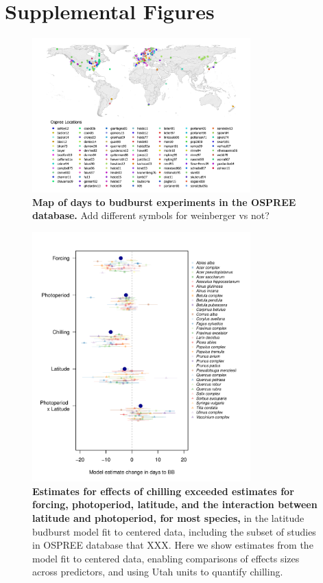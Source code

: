 \documentclass{article}
\begin{document}
% 
\newpage

\newpage
\section* {Supplemental Figures}

\newpage
\begin{figure}[h!]
\centering
\noindent \includegraphics[width=0.75\textwidth]{..//..//analyses/bb_analysis/figures/ospree_locations2.png}
\caption{\textbf{Map of days to budburst experiments in the OSPREE database.} Add different symbols for weinberger vs not?}
\label{fig:map}
\end{figure}




\newpage
\begin{figure}[h!]
\centering
\noindent \includegraphics[width=0.75\textwidth]{..//..//analyses/lat_analysis/figures/latanalysis_spcom_expramp_fp.pdf}
\caption{\textbf{Estimates for effects of chilling exceeded estimates for forcing, photoperiod, latitude, and the interaction between latitude and photoperiod, for most species,} in the latitude budburst model fit to centered data, including the subset of studies in OSPREE database that XXX. Here we show estimates from the model fit to centered data, enabling comparisons of effects sizes across predictors, and using Utah units to quantify chilling.}
\label{fig:lat}
\end{figure}
\end{document}
